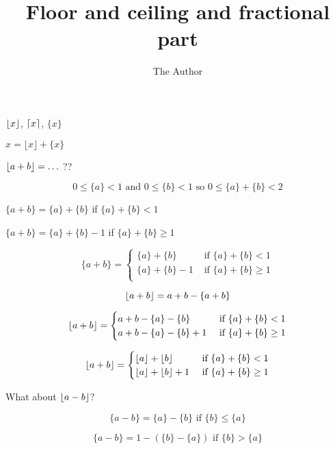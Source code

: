 \documentclass[11pt]{amsart}
\title{Floor and ceiling and fractional part}
\author{The Author}
\begin{document}
\maketitle

$ \left\lfloor {x} \right\rfloor $, $ \left\lceil {x} \right\rceil $, $\{x\}$

$x = \lfloor x \rfloor + \{x\}$


$
 \left\lfloor {a + b} \right\rfloor  = \ldots
$ ??


$$
0 \le \{a\} < 1  \text{ and } 0 \le \{b\} < 1  \text{ so } 0 \le \{a\} + \{b\} < 2
$$

$\{a + b\} = \{a\} + \{b\}$ if $\{a\} + \{b\} < 1$

$\{a + b\} = \{a\} + \{b\} -1 $ if $\{a\} + \{b\} \ge 1$

$$
\{a + b\} =
\begin{cases}
\{a\} + \{b\} & \text{ if } \{a\} + \{b\} < 1 \\
\{a\} + \{b\} -1  & \text{ if } \{a\} + \{b\} \ge 1 \\
\end{cases}
$$

$$
 \left\lfloor {a+b} \right\rfloor  = a + b - \{a + b\}
$$

$$
 \left\lfloor {a+b} \right\rfloor  = 
\begin{cases}
a + b - \{a\} - \{b\} & \text{ if } \{a\} + \{b\} < 1 \\
a + b - \{a\} - \{b\}  + 1  & \text{ if } \{a\} + \{b\} \ge 1 \\
\end{cases}
$$

$$
 \left\lfloor {a+b} \right\rfloor  = 
\begin{cases}
 \left\lfloor {a} \right\rfloor  +  \left\lfloor {b} \right\rfloor  & \text{ if } \{a\} + \{b\} < 1 \\
 \left\lfloor {a} \right\rfloor  +  \left\lfloor {b} \right\rfloor   + 1  & \text{ if } \{a\} + \{b\} \ge 1 \\
\end{cases}
$$

What about $ \left\lfloor {a -b} \right\rfloor $?



$$
\{a - b\} = \{a\} - \{b\} \text{ if } \{b\} \le \{a\}
$$

$$
\{a - b\} = 1 - (\{b\} - \{a\}) \text{ if } \{b\} > \{a\}
$$
\end{document}
